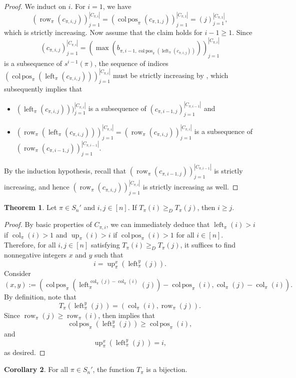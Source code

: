 \documentclass[12pt]{amsart}
\DeclareMathOperator{\col}{col}
\DeclareMathOperator{\colpos}{col\,pos}
\DeclareMathOperator{\leftof}{left}
\DeclareMathOperator{\row}{row}
\DeclareMathOperator{\upof}{up}
\theoremstyle{definition}
\newtheorem{theorem}{Theorem}[section]
\newtheorem{corollary}[theorem]{Corollary}
\begin{document}
\begin{proof}
We induct on $i$. For $i=1$, we have \[(\row_{\pi}(c_{\pi,i,j}))_{j=1}^{|C_{\pi,i}|}=(\colpos_{\pi}(c_{\pi,1,j}))_{j=1}^{|C_{\pi,1}|}=(j)_{j=1}^{|C_{\pi,1}|},\] which is strictly increasing. Now assume that the claim holds for $i-1\ge1$. Since
\[(c_{\pi,i,j})_{j=1}^{|C_{\pi,i}|}=(\max(b_{\pi,i-1,\colpos_{\pi}(\leftof_{\pi}(c_{\pi,i,j}))}))_{j=1}^{|C_{\pi,i}|}\]
is a subsequence of $s^{i-1}(\pi)$, the sequence of indices $(\colpos_{\pi}(\leftof_{\pi}(c_{\pi,i,j})))_{j=1}^{|C_{\pi,i}|}$ must be strictly increasing by , which subsequently implies that
\begin{itemize}
\item $(\leftof_{\pi}(c_{\pi,i,j})))_{j=1}^{|C_{\pi,i}|}$ is a subsequence of $(c_{\pi,i-1,j})_{j=1}^{|C_{\pi,i-1}|}$ and
\item $(\row_{\pi}(\leftof_{\pi}(c_{\pi,i,j})))_{j=1}^{|C_{\pi,i}|}=(\row_{\pi}(c_{\pi,i,j}))_{j=1}^{|C_{\pi,i}|}$ is a subsequence of \\ $(\row_{\pi}(c_{\pi,i-1,j}))_{j=1}^{|C_{\pi,{i-1}}|}$.
\end{itemize} 
By the induction hypothesis, recall that $(\row_{\pi}(c_{\pi,i-1,j}))_{j=1}^{|C_{\pi,{i-1}}|}$ is strictly increasing, and hence $(\row_{\pi}(c_{\pi,i,j}))_{j=1}^{|C_{\pi,i}|}$ is strictly increasing as well.
\end{proof}
\begin{theorem}
Let $\pi\in S_n'$ and $i,j\in [n]$. If $T_{\pi}(i)\ge_{D}T_{\pi}(j)$, then $i\ge j$.
\end{theorem}
\begin{proof}
By basic properties of $C_{\pi,i}$, we can immediately deduce that $\leftof_{\pi}(i)>i$ if $\col_{\pi}(i)>1$ and $\upof_{\pi}(i)>i$ if $\colpos_{\pi}(i)>1$ for all $i\in[n]$. Therefore, for all $i,j\in[n]$ satisfying $T_{\pi}(i)\ge_{D}T_{\pi}(j)$, it suffices to find nonnegative integers $x$ and $y$ such that \[i=\upof_{\pi}^x(\leftof_{\pi}^y(j)).\] 
Consider
\[(x,y):=\left(\colpos_{\pi}\left(\leftof_{\pi}^{\col_{\pi}(j)-\col_{\pi}(i)}(j)\right)-\colpos_{\pi}(i), \col_{\pi}(j)-\col_{\pi}(i)\right).\]
By definition, note that
\[T_{\pi}\left(\leftof_{\pi}^{y}(j)\right)=(\col_{\pi}(i), \row_{\pi}(j)).\]
Since $\row_{\pi}(j)\ge \row_{\pi}(i)$,  then implies that 
\[\colpos_{\pi}\left(\leftof_{\pi}^{y}(j)\right) \ge \colpos_{\pi}(i),\]
and
\[\upof_{\pi}^{x}\left(\leftof_{\pi}^{y}(j)\right) = i,\]
as desired.
\end{proof}
\begin{corollary}
For all $\pi\in S_n'$, the function $T_{\pi}$ is a bijection.
\end{corollary}
\end{document}
